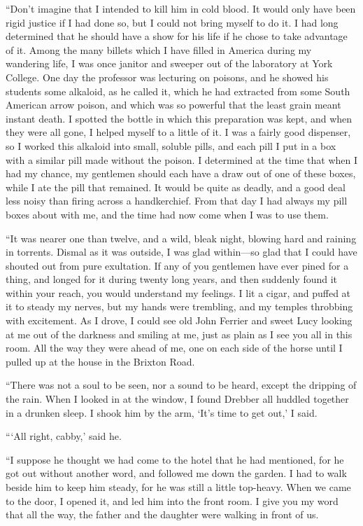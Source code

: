 \documentclass[12pt,english,oneside]{book}
\newcommand{\mdsh}[1]{\mbox{#1}\linebreak[1]}
\begin{document}
{}``Don't imagine that I intended to kill him in cold blood. It would
only have been rigid justice if I had done so, but I could not bring
myself to do it. I had long determined that he should have a show
for his life if he chose to take advantage of it. Among the many billets
which I have filled in America during my wandering life, I was once
janitor and sweeper out of the laboratory at York College. One day
the professor was lecturing on poisons, and he showed his students
some alkaloid, as he called it, which he had extracted from some South
American arrow poison, and which was so powerful that the least grain
meant instant death. I spotted the bottle in which this preparation
was kept, and when they were all gone, I helped myself to a little
of it. I was a fairly good dispenser, so I worked this alkaloid into
small, soluble pills, and each pill I put in a box with a similar
pill made without the poison. I determined at the time that when I
had my chance, my gentlemen should each have a draw out of one of
these boxes, while I ate the pill that remained. It would be quite
as deadly, and a good deal less noisy than firing across a handkerchief.
From that day I had always my pill boxes about with me, and the time
had now come when I was to use them.

{}``It was nearer one than twelve, and a wild, bleak night, blowing
hard and raining in torrents. Dismal as it was outside, I was glad
within\mdsh{---}so glad that I could have shouted out from pure exultation.
If any of you gentlemen have ever pined for a thing, and longed for
it during twenty long years, and then suddenly found it within your
reach, you would understand my feelings. I lit a cigar, and puffed
at it to steady my nerves, but my hands were trembling, and my temples
throbbing with excitement. As I drove, I could see old John Ferrier
and sweet Lucy looking at me out of the darkness and smiling at me,
just as plain as I see you all in this room. All the way they were
ahead of me, one on each side of the horse until I pulled up at the
house in the Brixton Road.

{}``There was not a soul to be seen, nor a sound to be heard, except
the dripping of the rain. When I looked in at the window, I found
Drebber all huddled together in a drunken sleep. I shook him by the
arm, `It's time to get out,' I said.

{}```All right, cabby,' said he.

{}``I suppose he thought we had come to the hotel that he had mentioned,
for he got out without another word, and followed me down the garden.
I had to walk beside him to keep him steady, for he was still a little
top-heavy. When we came to the door, I opened it, and led him into
the front room. I give you my word that all the way, the father and
the daughter were walking in front of us.
\end{document}
